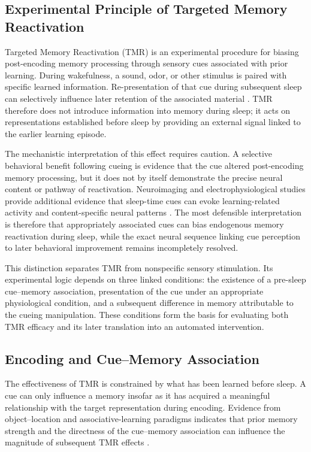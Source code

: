 \subsection{Experimental Principle of Targeted Memory Reactivation}

Targeted Memory Reactivation (TMR) is an experimental procedure for biasing
post-encoding memory processing through sensory cues associated with prior
learning. During wakefulness, a sound, odor, or other stimulus is paired with
specific learned information. Re-presentation of that cue during subsequent
sleep can selectively influence later retention of the associated material
\citep{rasch2007odor,rudoy2009strengthening,oudiette2013upgrading}. TMR
therefore does not introduce information into memory during sleep; it acts on
representations established before sleep by providing an external signal linked
to the earlier learning episode.

The mechanistic interpretation of this effect requires caution. A selective
behavioral benefit following cueing is evidence that the cue altered
post-encoding memory processing, but it does not by itself demonstrate the
precise neural content or pathway of reactivation. Neuroimaging and
electrophysiological studies provide additional evidence that sleep-time cues
can evoke learning-related activity and content-specific neural patterns
\citep{rasch2007odor,cairney2018spindle,wang2019signals}. The most defensible
interpretation is therefore that appropriately associated cues can bias
endogenous memory reactivation during sleep, while the exact neural sequence
linking cue perception to later behavioral improvement remains incompletely
resolved.

This distinction separates TMR from nonspecific sensory stimulation. Its
experimental logic depends on three linked conditions: the existence of a
pre-sleep cue--memory association, presentation of the cue under an appropriate
physiological condition, and a subsequent difference in memory attributable to
the cueing manipulation. These conditions form the basis for evaluating both
TMR efficacy and its later translation into an automated intervention.


\subsection{Encoding and Cue--Memory Association}

The effectiveness of TMR is constrained by what has been learned before sleep.
A cue can only influence a memory insofar as it has acquired a meaningful
relationship with the target representation during encoding. Evidence from
object--location and associative-learning paradigms indicates that prior memory
strength and the directness of the cue--memory association can influence the
magnitude of subsequent TMR effects
\citep{creery2015priorlearning,cairney2016benefits}.

